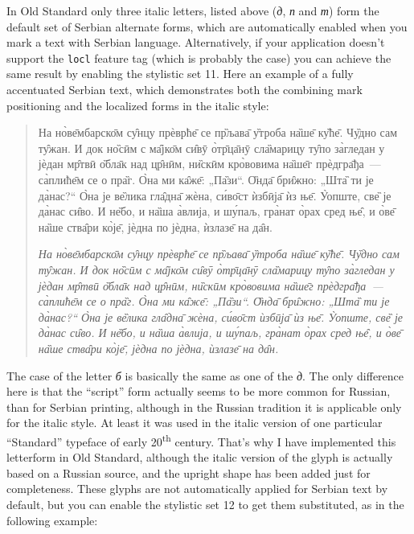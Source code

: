 \documentclass[12pt,a4paper,openany]{book}
\begin{document}
In Old Standard only three italic letters, listed above (\textit{д},
\textit{п} and \textit{т}) form the default set of Serbian alternate forms,
which are automatically enabled when you mark a text with Serbian language.
Alternatively, if your application doesn’t support the \texttt{locl}
feature tag (which is probably the case) you can achieve the same result by
enabling the stylistic set 11. Here an example of a fully accentuated 
Serbian text, which demonstrates both the combining mark positioning and
the localized forms in the italic style:

\begin{quote}
\large

На но̀ве̄мбарско̄м су̑нцу прѐврће̄ се пр̏љава̄ у̏троба на̏ше̄ ку̏ће̄. Чу̏дно сам ту̑жан.
И док но̏сӣм с ма̑јко̄м си̑вӯ о̀тр̄ца̄нӯ сла̏марицу ту̑по за̀гледан у јѐдан мр̑твӣ
о̏бла̄к над цр̑нӣм, ни̏скӣм кро̀во\-вима на̏ше̄г прѐдгра̄ђа~— са̀плиће̄м се о пра̏г. О̀на
ми ка̑же̄: „Па̏зи“. О̏нда̄ бри̑жно: „Шта̏ ти је да̀нас?“ О̀на је ве̏лика гла̑дна̄ жѐна,
си́во̄ст ѝзбӣја̄ ѝз ње̄. У̀опште, све̏ је да̀нас си̑во. И не̏бо, и на̏ша а̀влија, и
шу́паљ, гра̀нат о̀рах сред ње̑, и о̀ве̄ на̏ше ства̑ри ко̀је̄, јѐдна по јѐдна, ѝзлазе̄
на да̑н.

\smallskip

\itshape
На но̀ве̄мбарско̄м су̑нцу прѐврће̄ се пр̏љава̄ у̏троба на̏ше̄ ку̏ће̄. Чу̏дно сам ту̑жан.
И док но̏сӣм с ма̑јко̄м си̑вӯ о̀тр̄ца̄нӯ сла̏ма\-рицу ту̑по за̀гледан у јѐдан мр̑твӣ
о̏бла̄к над цр̑нӣм, ни̏скӣм кро̀вовима на̏ше̄г прѐдгра̄ђа~— са̀плиће̄м се о пра̏г. О̀на
ми ка̑же̄: „Па̏зи“. О̏нда̄ бри̑жно: „Шта̏ ти је да̀нас?“ О̀на је ве̏лика гла̑д\-на̄ жѐна,
си́во̄ст ѝзбӣја̄ ѝз ње̄. У̀опште, све̏ је да̀нас си̑во. И не̏бо, и на̏ша а̀влија, и
шу́паљ, гра̀нат о̀рах сред ње̑, и о̀ве̄ на̏ше ства̑ри ко̀је̄, јѐдна по јѐдна, ѝзлазе̄
на да̑н.

\end{quote}

The case of the letter \textit{б} is basically the same as one of the
\textit{д}. The only difference here is that the “script” form actually
seems to be more common for Russian, than for Serbian printing, although in
the Russian tradition it is applicable only for the italic style. At least
it was used in the italic version of one particular “Standard” typeface of
early 20\textsuperscript{th} century. That’s why I have implemented this
letterform in Old Standard, although the italic version of the glyph is
actually based on a Russian source, and the upright shape has been added
just for completeness. These glyphs are not automatically applied for
Serbian text by default, but you can enable the stylistic set 12 to get
them substituted, as in the following example:
\end{document}
